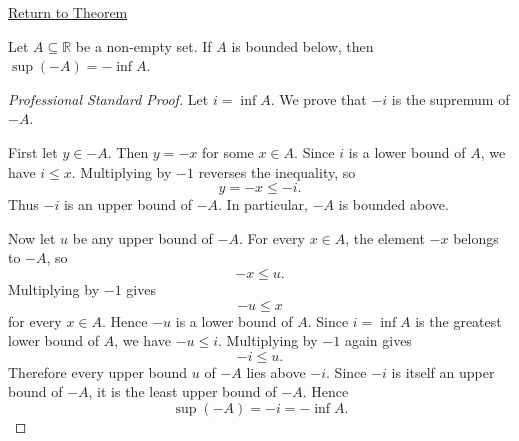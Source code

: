 \newpage
{}
\label{prf:negation-exchange-sup-inf}

\begin{remark*}[Return]
\hyperref[thm:negation-exchange-sup-inf]{Return to Theorem}
\end{remark*}


\begin{theorem*}
Let $A \subseteq \mathbb{R}$ be a non-empty set. If $A$ is bounded below, then $\sup(-A) = -\inf A$.
\end{theorem*}

\begin{proof}[Professional Standard Proof]
\LRAProofBodyStart
Let \(i=\inf A\). We prove that \(-i\) is the supremum of \(-A\).

First let \(y\in -A\). Then \(y=-x\) for some \(x\in A\). Since \(i\) is a
lower bound of \(A\), we have \(i\le x\). Multiplying by \(-1\) reverses the
inequality, so
\[
y=-x\le -i.
\]
Thus \(-i\) is an upper bound of \(-A\). In particular, \(-A\) is bounded
above.

Now let \(u\) be any upper bound of \(-A\). For every \(x\in A\), the element
\(-x\) belongs to \(-A\), so
\[
-x\le u.
\]
Multiplying by \(-1\) gives
\[
-u\le x
\]
for every \(x\in A\). Hence \(-u\) is a lower bound of \(A\). Since \(i=\inf A\)
is the greatest lower bound of \(A\), we have \(-u\le i\). Multiplying by
\(-1\) again gives
\[
-i\le u.
\]
Therefore every upper bound \(u\) of \(-A\) lies above \(-i\). Since \(-i\) is
itself an upper bound of \(-A\), it is the least upper bound of \(-A\). Hence
\[
\sup(-A)=-i=-\inf A.
\]
\end{proof}

